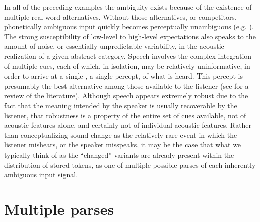 In all of the preceding examples the ambiguity exists because of the
existence of multiple real-word alternatives. Without those alternatives,
or competitors, phonetically ambiguous input quickly becomes perceptually
unambiguous (e.g. \citealp{warren1970perceptual,ganong1980phonetic}).
The strong susceptibility of low-level  to high-level expectations
also speaks to the amount of noise, or essentially unpredictable variability,
in the acoustic realization of a given abstract category. Speech 
involves the complex integration of multiple cues, each of which,
in isolation, may be relatively uninformative, in order to arrive
at a single , a single percept, of what is heard. This percept
is presumably the best alternative among those available to the listener
(see \citealt{davis2007hearing} for a review of the literature). Although
speech  appears extremely robust due to the fact that the
meaning intended by the speaker is usually recoverable by the listener,
that robustness is a property of the entire set of cues available,
not of acoustic features alone, and certainly not of individual acoustic
features. Rather than conceptualizing sound change as the relatively
rare event in which the listener mishears, or the speaker misspeaks,
it may be the case that what we typically think of as the “changed”
variants are already present within the distribution of stored tokens,
as one of multiple possible parses of each inherently ambiguous input
signal.

\section{Multiple parses}

